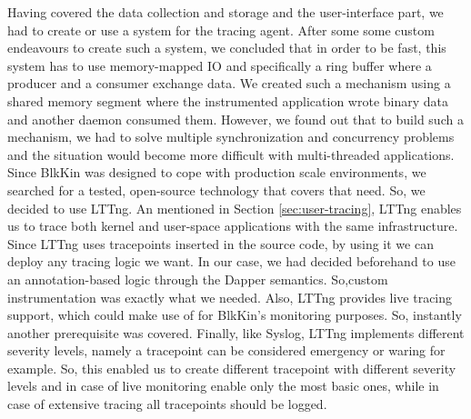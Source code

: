 Having covered the data collection and storage and the user-interface part, we
had to create or use a system for the tracing agent. After some some custom
endeavours to create such a system, we concluded that in order to be fast, this
system has to use memory-mapped IO and specifically a ring buffer where a
producer and a consumer exchange data. We created such a mechanism using a
shared memory segment where the instrumented application wrote binary data and
another daemon consumed them. However, we found out that to build such a
mechanism, we had to solve multiple synchronization and concurrency problems and
the situation would become more difficult with multi-threaded applications.
Since BlkKin was designed to cope with production scale environments, we
searched for a tested, open-source technology that covers that need. So, we
decided to use LTTng. An mentioned in Section \ref{sec:user-tracing}, LTTng
enables us to trace both kernel and user-space applications with the same
infrastructure. Since LTTng uses tracepoints inserted in the source code, by
using it we can deploy any tracing logic we want. In our case, we had decided
beforehand to use an annotation-based logic through the Dapper semantics.
So,custom instrumentation was exactly what we needed. Also, LTTng provides live
tracing support, which could make use of for BlkKin's monitoring purposes. So,
instantly another prerequisite was covered. Finally, like Syslog, LTTng
implements different severity levels, namely a tracepoint can be considered
emergency or waring for example. So, this enabled us to create different
tracepoint with different severity levels and in case of live monitoring enable
only the most basic ones, while in case of extensive tracing all tracepoints
should be logged.

